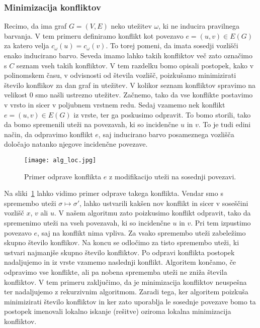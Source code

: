 \documentclass[12pt,a4paper,twoside]{article}
\theoremstyle{definition} %
\theoremstyle{plain} %
\numberwithin{equation}{section}  %
\begin{document}
\subsubsection{Minimizacija konfliktov}

Recimo, da ima graf $G = (V, E)$ neko utežitev $\omega$, ki ne inducira pravilnega barvanja. V tem primeru definiramo konflikt kot povezavo $e =(u, v) \in E(G)$ za katero velja $c_{\omega}(u) = c_{\omega}(v)$. To torej pomeni, da imata sosedji vozlišči enako inducirano barvo. Seveda imamo lahko takih konfliktov več zato označimo s $C$ seznam vseh takih konfliktov. V tem razdelku bomo opisali postopek, kako v polinomskem času, v odvisnosti od števila vozlišč, poizkušamo minimizirati število konflikov za dan graf in utežitev. V kolikor seznam konfliktov spravimo na velikost $0$ smo našli ustrezno utežitev. Začnemo, tako da vse konflikte postavimo v vrsto in sicer v poljubnem vrstnem redu. Sedaj vzamemo nek konflikt $e = (u, v) \in E(G)$ iz vrste, ter ga poskusimo odpravit. To bomo storili, tako da bomo spremenili uteži na povezavah, ki so incidenčne $u$ in $v$. To je tudi edini način, da odpravimo konflikt $e$, saj inducirano barvo posameznega vozlišča določajo natanko njegove incidenčne povezave.
 \begin{figure}[h!]
\caption{Primer odprave konflikta $e$ z modifikacijo uteži na sosednji povezavi.}
\label{alg_loc}
\centering
    \texttt{[image: alg\_loc.jpg]}
    \end{figure}
Na sliki~\ref{alg_loc} lahko vidimo primer odprave takega konflikta. Vendar smo s spremembo uteži $\sigma \mapsto\sigma'$, lahko ustvarili kakšen nov konflikt in sicer v soseščini vozlišč $x$, $v$ ali $u$. V našem algoritmu zato poizkusimo konflikt odpravit, tako da spremenimo uteži na vseh povezavah, ki so incidenčne $u$ in $v$. Pri tem izpustimo povezavo $e$, saj na konflikt nima vpliva. Za vsako spremembo uteži zabeležimo skupno število konflikov. Na koncu se odločimo za tisto spremembo uteži, ki ustvari najmanjše skupno število konfliktov. Po odpravi konflikta postopek nadaljujemo in iz vrste vzamemo naslednji konflikt. Algoritem končamo, če odpravimo vse konflikte, ali pa nobena sprememba uteži ne zniža števila konfliktov. V tem primeru zaključimo, da je minimizacija konfliktov neuspešna ter nadaljujemo z rekurzivnim algoritmom. Zaradi tega, ker algoritem poizkuša minimizirati število konfliktov in ker zato uporablja le sosednje povezave bomo ta postopek imenovali lokalno iskanje (rešitve) oziroma lokalna minimizacija konfliktov.
\end{document}
